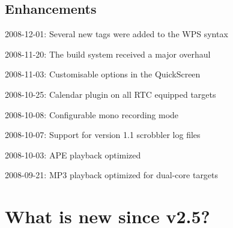 \subsection{Enhancements}
\begin{changelog}
\item 2008-12-01: Several new tags were added to the WPS syntax
\item 2008-11-20: The build system received a major overhaul
\item 2008-11-03: Customisable options in the QuickScreen
\item 2008-10-25: Calendar plugin on all RTC equipped targets
\item 2008-10-08: Configurable mono recording mode
\item 2008-10-07: Support for version 1.1 scrobbler log files
\item 2008-10-03: APE playback optimized
\item 2008-09-21: MP3 playback optimized for dual-core targets
\end{changelog}

\section{What is new since v2.5?}

